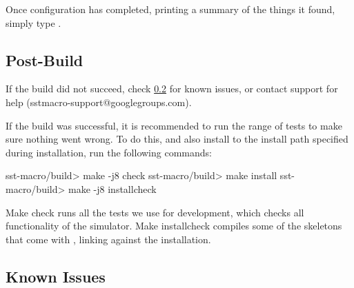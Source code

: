 Once configuration has completed, printing a summary of the things it found, simply type .  

\subsection{Post-Build}
\label{subsec:postbuild}

If the build did not succeed, check \ref{subsec:build:issues} for known issues, or contact \sstmacro support for help (sstmacro-support@googlegroups.com).

If the build was successful, it is recommended to run the range of tests to make sure nothing went wrong.  
To do this, and also install \sstmacro  to the install path specified during installation, run the following commands:

\begin{ShellCmd}
sst-macro/build> make -j8 check
sst-macro/build> make install
sst-macro/build> make -j8 installcheck
\end{ShellCmd}
Make check runs all the tests we use for development, which checks all functionality of the simulator.  
Make installcheck compiles some of the skeletons that come with \sstmacro, linking against the installation.  


\subsection{Known Issues}
\label{subsec:build:issues}


